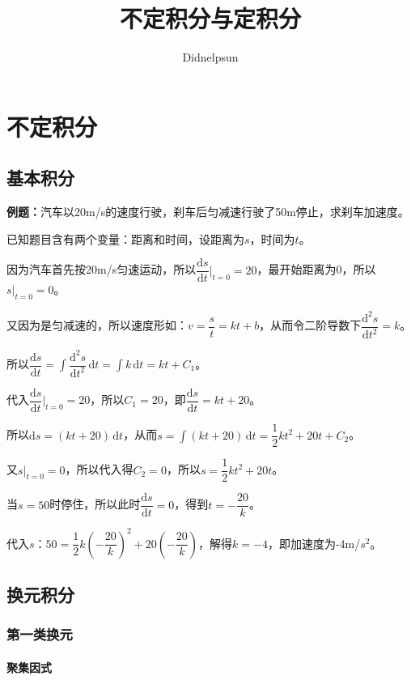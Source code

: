 \documentclass[UTF8, 12pt]{ctexart}
\author{Didnelpsun}
\title{不定积分与定积分}
\date{}
\begin{document}
\maketitle
\pagestyle{empty}
\thispagestyle{empty}
\tableofcontents
\thispagestyle{empty}
\newpage
\pagestyle{plain}
\setcounter{page}{1}
\section{不定积分}
\subsection{基本积分}

\textbf{例题：}汽车以20m/s的速度行驶，刹车后匀减速行驶了50m停止，求刹车加速度。

已知题目含有两个变量：距离和时间，设距离为$s$，时间为$t$。

因为汽车首先按20m/s匀速运动，所以$\dfrac{\textrm{d}s}{\textrm{d}t}\bigg\vert_{t=0}=20$，最开始距离为0，所以$s\vert_{t=0}=0$。

又因为是匀减速的，所以速度形如：$v=\dfrac{s}{t}=kt+b$，从而令二阶导数下$\dfrac{\textrm{d}^2s}{\textrm{d}t^2}=k$。

所以$\displaystyle{\dfrac{\textrm{d}s}{\textrm{d}t}=\int\dfrac{\textrm{d}^2s}{\textrm{d}t^2}\,\textrm{d}t=\int k\,\textrm{d}t}=kt+C_1$。

代入$\dfrac{\textrm{d}s}{\textrm{d}t}\bigg\vert_{t=0}=20$，所以$C_1=20$，即$\dfrac{\textrm{d}s}{\textrm{d}t}=kt+20$。

所以$\textrm{d}s=(kt+20)\,\textrm{d}t$，从而$s=\displaystyle{\int(kt+20)\,\textrm{d}t}=\dfrac{1}{2}kt^2+20t+C_2$。

又$s\vert_{t=0}=0$，所以代入得$C_2=0$，所以$s=\dfrac{1}{2}kt^2+20t$。

当$s=50$时停住，所以此时$\dfrac{\textrm{d}s}{\textrm{d}t}=0$，得到$t=-\dfrac{20}{k}$。

代入$s$：$50=\dfrac{1}{2}k\left(-\dfrac{20}{k}\right)^2+20\left(-\dfrac{20}{k}\right)$，解得$k=-4$，即加速度为-4m/$s^2$。

\subsection{换元积分}

\subsubsection{第一类换元}

\paragraph{聚集因式} \leavevmode \medskip
\end{document}
